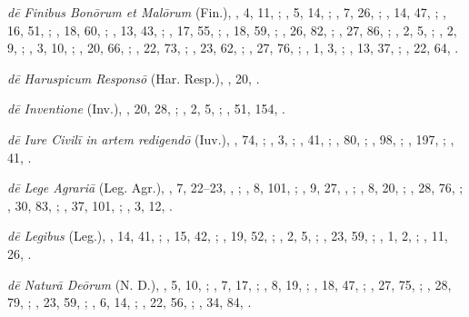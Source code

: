 \begin{autindex}
  \subitem \emph{dē Finibus Bonōrum et Malōrum} (Fin.),
    ,  4, 11, ;
    ,  5, 14, ;
    ,  7, 26, ;
    , 14, 47, ;
    , 16, 51, ;
    , 18, 60, ;
    , 13, 43, ;
    , 17, 55, ;
    , 18, 59, ;
    , 26, 82, ;
    , 27, 86, ;
    ,  2,  5, ;
    ,  2,  9, ;
    ,  3, 10, ;
    , 20, 66, ;
    , 22, 73, ;
    , 23, 62, ;
    , 27, 76, ;
    ,  1,  3, ;
    , 13, 37, ;
    , 22, 64, .

  \subitem \emph{dē Haruspicum Responsō} (Har. Resp.),
    , 20, .

  \subitem \emph{dē Inventione} (Inv.),
    , 20,  28, ;
    ,  2,   5, ;
    , 51, 154, .

  \subitem \emph{dē Iure Civilī in artem redigendō} (Iuv.),
    ,  74, ;
    ,   3, ;
    ,  41, ;
    ,  80, ;
    ,  98, ;
    , 197, ;
    ,  41, .

\columnbreak

  \subitem \emph{dē Lege Agrariā} (Leg. Agr.),
    ,  7,  22–23, , ;
    ,  8,  101, ;
    ,  9,  27, , ;
    ,  8,  20, ;
    , 28,  76, ;
    , 30,  83, ;
    , 37, 101, ;
    ,  3,  12, .

  \subitem \emph{dē Legibus} (Leg.),
    , 14, 41, ;
    , 15, 42, ;
    , 19, 52, ;
    ,  2,  5, ;
    , 23, 59, ;
    ,  1,  2, ;
    , 11, 26, .

  \subitem \emph{dē Naturā Deōrum} (N. D.),
    ,  5, 10, ;
    ,  7, 17, ;
    ,  8, 19, ;
    , 18, 47, ;
    , 27, 75, ;
    , 28, 79, ;
    , 23, 59, ;
    ,  6, 14, ;
    , 22, 56, ;
    , 34, 84, .


\end{autindex}
